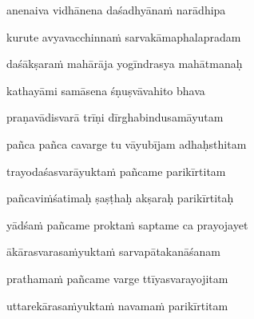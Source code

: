 anenaiva vidhānena daśadhyānaṁ narādhipa\thinspace{\dandab} \dontdisplaylinenum

kurute avyavacchinnaṁ sarvakāmaphalapradam \veg\dontdisplaylinenum



daśākṣaraṁ mahārāja yogīndrasya mahātmanaḥ\thinspace{\dandab} \dontdisplaylinenum

kathayāmi samāsena śṇuṣvāvahito bhava \veg\dontdisplaylinenum
{}

praṇavādisvarā trīṇi dīrghabindusamāyutam\thinspace{\dandab} \dontdisplaylinenum

pañca pañca cavarge tu vāyubījam adhaḥsthitam \veg\dontdisplaylinenum
{}

trayodaśasvarāyuktaṁ pañcame parikīrtitam\thinspace{\dandab} \dontdisplaylinenum

pañcaviṁśatimaḥ ṣaṣṭhaḥ akṣaraḥ parikīrtitaḥ \veg\dontdisplaylinenum
{}

yādśaṁ pañcame proktaṁ saptame ca prayojayet\thinspace{\dandab} \dontdisplaylinenum

ākārasvarasaṁyuktaṁ sarvapātakanāśanam \veg\dontdisplaylinenum
{}

prathamaṁ pañcame varge ttīyasvarayojitam\thinspace{\dandab} \dontdisplaylinenum

uttarekārasaṁyuktaṁ navamaṁ parikīrtitam \veg\dontdisplaylinenum
{}


